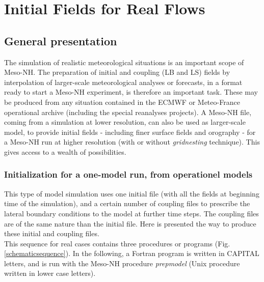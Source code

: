 %
\chapter{Initial Fields for Real Flows\label{REAL}}
\minitoc

\section{General presentation}
The simulation of realistic meteorological situations is an important scope
of Meso-NH. The preparation of initial and coupling (LB and LS) fields
by interpolation of larger-scale
meteorological analyses or forecasts, in a format ready to start a Meso-NH
experiment, is therefore an important task.
These may be produced from any situation contained in the ECMWF or Meteo-France
operational archive (including the special reanalyses projects).
A Meso-NH file, coming from a simulation at lower resolution,
can also be used as larger-scale model, to provide initial fields
- including finer surface fields and orography - for
a Meso-NH run at higher resolution
(with or without {\it gridnesting} technique).
This gives access to a wealth of possibilities.\\

\subsection{Initialization for a one-model run, from operationel models}

This type of model simulation uses one initial file (with all the fields
at beginning time of the simulation), and a certain number of coupling files
to prescribe the lateral boundary conditions to the model at further
time steps. The coupling files are of the same nature than the initial file.
Here is presented the way to produce these initial and coupling files.\\

This sequence for real cases contains three procedures or
programs (Fig. \ref{schematicsequence}).
In the following, a Fortran program is written in CAPITAL letters,
and is run with the Meso-NH procedure {\sl prepmodel} (Unix procedure
written in lower case letters).

